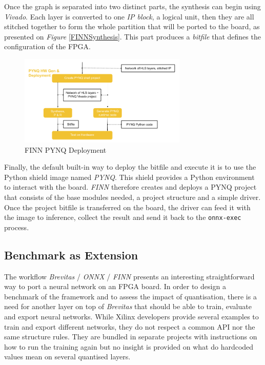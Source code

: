 Once the graph is separated into two distinct parts, the synthesis can begin using \emph{Vivado}. Each layer is converted to one \emph{IP block}, a logical unit, then they are all stitched together to form the whole partition that will be ported to the board, as presented on \emph{Figure} \ref{FINNSynthesis}. This part produces a \emph{bitfile} that defines the configuration of the FPGA.

\begin{figure}[htbp]
	\centering
		\includegraphics[width=8cm]{Figures/FINNPYNQ.png}
	\caption[FINN PYNQ Deployment]{FINN PYNQ Deployment}
	\label{fig:FINNPYNQ}
\end{figure}

Finally, the default built-in way to deploy the bitfile and execute it is to use the Python shield image named \emph{PYNQ}. This shield provides a Python environment to interact with the board. \emph{FINN} therefore creates and deploys a PYNQ project that consists of the base modules needed, a project structure and a simple driver. Once the project bitfile is transferred on the board, the driver can feed it with the image to inference, collect the result and send it back to the \texttt{onnx-exec} process.


\subsection{Benchmark as Extension}

The workflow \emph{Brevitas} / \emph{ONNX} / \emph{FINN} presents an interesting straightforward way to port a neural network on an FPGA board. In order to design a benchmark of the framework and to assess the impact of quantisation, there is a need for another layer on top of \emph{Brevitas} that should be able to train, evaluate and export neural networks. While Xilinx developers provide several examples to train and export different networks, they do not respect a common API nor the same structure rules. They are bundled in separate projects with instructions on how to run the training again but no insight is provided on what do hardcoded values mean on several quantised layers.

